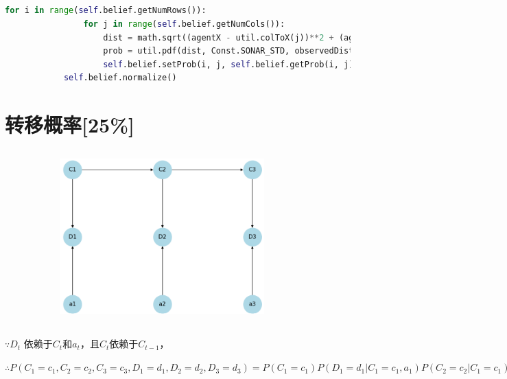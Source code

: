 \documentclass{ctexart}
\begin{document}
		\subsection{}
		\begin{lstlisting}[language=Python]
			for i in range(self.belief.getNumRows()):
				for j in range(self.belief.getNumCols()):
					dist = math.sqrt((agentX - util.colToX(j))**2 + (agentY - util.rowToY(i))**2)
					prob = util.pdf(dist, Const.SONAR_STD, observedDist)
					self.belief.setProb(i, j, self.belief.getProb(i, j) * prob)
			self.belief.normalize()
			\end{lstlisting}

		\section{转移概率[25\%]}
		\subsection{}
		\begin{figure}[H]
			\centering
			\includegraphics[height=6cm,width=10cm]{2.png}
			\end{figure}
			\subsection{}
			$\because D_t$ 依赖于$C_t$和$a_t$，且$C_t$依赖于$C_{t-1}$，
			
			$\therefore P(C_1 = c_1, C_2 = c_2, C_3 = c_3, D_1 = d_1, D_2 = d_2, D_3 = d_3) =P(C_1 = c_1) P(D_1 =d_1 | C_1 = c_1, a_1) P(C_2 = c_2 | C_1 = c_1) P(D_2 = d_2 | C_2 = c_2, a_2) P(C_3 = c_3| C_2 = c_2) P(D_3 =d_3| C_3 = c_3, a_3)$
\end{document}

